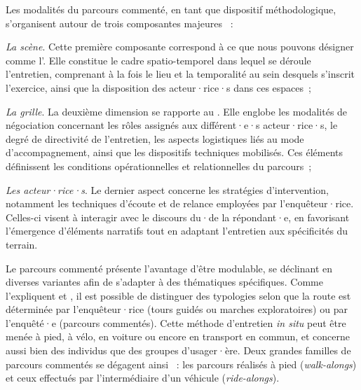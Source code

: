\begin{refsegment}
Les modalités du parcours commenté, en tant que dispositif méthodologique, s’organisent autour de trois composantes majeures \textcolor{blue}{\autocites{blanchet_entretien_2015}[7]{despres_replacer_2019}}~:
\begin{customitemize}
    \item \textsl{La scène}. Cette première composante correspond à ce que nous pouvons désigner comme l’. Elle constitue le cadre spatio-temporel dans lequel se déroule l’entretien, comprenant à la fois le lieu et la temporalité au sein desquels s’inscrit l’exercice, ainsi que la disposition des acteur·rice·s dans ces espaces~;
    \item \textsl{La grille}. La deuxième dimension se rapporte au . Elle englobe les modalités de négociation concernant les rôles assignés aux différent·e·s acteur·rice·s, le degré de directivité de l’entretien, les aspects logistiques liés au mode d’accompagnement, ainsi que les dispositifs techniques mobilisés. Ces éléments définissent les conditions opérationnelles et relationnelles du parcours~;
    \item \textsl{Les acteur·rice·s}. Le dernier aspect concerne les stratégies d’intervention, notamment les techniques d’écoute et de relance employées par l’enquêteur·rice. Celles-ci visent à interagir avec le discours du·de la répondant·e, en favorisant l’émergence d’éléments narratifs tout en adaptant l’entretien aux spécificités du terrain.
\end{customitemize}%

Le parcours commenté présente l’avantage d’être modulable, se déclinant en diverses variantes afin de s’adapter à des thématiques spécifiques. Comme l’expliquent \textcolor{blue}{\textcite[850]{evans_walking_2011}} et \textcolor{blue}{\textcite[7]{wegerif_ride-along_2019}}, il est possible de distinguer des typologies selon que la route est déterminée par l’enquêteur·rice (tours guidés ou marches exploratoires) ou par l’enquêté·e (parcours commentés). Cette méthode d’entretien \textsl{in situ} peut être menée à pied, à vélo, en voiture ou encore en transport en commun, et concerne aussi bien des individus que des groupes d'usager·ère. Deux grandes familles de parcours commentés se dégagent ainsi \textcolor{blue}{\autocite[456]{kusenbach_street_2003}}~: les parcours réalisés à pied (\textsl{walk-alongs}) et ceux effectués par l'intermédiaire d’un véhicule (\textsl{ride-alongs}).


\end{refsegment}
